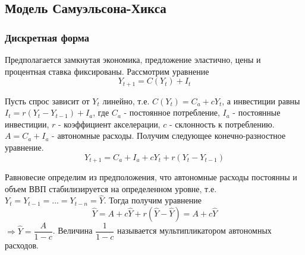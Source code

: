 \subsection{Модель Самуэльсона-Хикса}
\subsubsection{Дискретная форма}
Предполагается замкнутая экономика, предложение эластично, цены и процентная ставка фиксированы.
Рассмотрим уравнение
\begin{equation}
  Y_{t+1}=C(Y_t)+I_t
\end{equation}

Пусть спрос зависит от $Y_t$ линейно, т.е. $C(Y_t)=C_a+cY_t$, а инвестиции равны $I_t=r(Y_t-Y_{t-1}) +I_a$, где
$C_a$ - постоянное потребление, $I_a$ - постоянные инвестиции, $r$ - коэффициент акселерации, $c$ - склонность к потреблению.
 $A=C_a+I_a$ - автономные расходы. Получим следующее конечно-разностное уравнение.
 \begin{equation}
   Y_{t+1}=C_a+I_a + cY_t + r(Y_t-Y_{t-1})
 \end{equation}

 Равновесие определим из предположения, что автономные расходы постоянны и объем ВВП стабилизируется на определенном уровне, т.е.
 $Y_t=Y_{t-1}=...=Y_{t-n}=\widehat{Y}$. Тогда получим уравнение
 \begin{equation}
   \widehat{Y}=A + c\widehat{Y} + r(\widehat{Y}-\widehat{Y})=A+c\widehat{Y}
 \end{equation}
 $\Rightarrow \widehat{Y}=\dfrac{A}{1-c}$. Величина $\dfrac{1}{1-c}$ называется мультипликатором автономных расходов.

